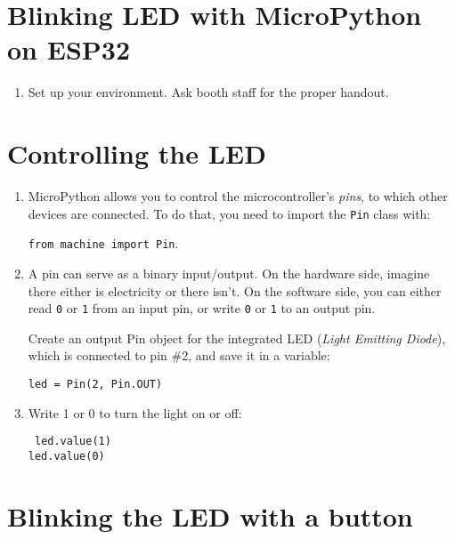 \documentclass[a4paper,10pt]{article}
\begin{document}
\section*{Blinking LED with MicroPython on ESP32}

\begin{enumerate}
\item Set up your environment. Ask booth staff for the proper handout.

\end{enumerate}

\section*{Controlling the LED}

\begin{enumerate}[resume]

\item MicroPython allows you to control the microcontroller's \emph{pins},
      to which other devices are connected.
      To do that, you need to import the \texttt{Pin} class with:

      \texttt{from machine import Pin}.

\item A pin can serve as a binary input/output.
      On the hardware side, imagine there either is electricity or there isn't.
      On the software side, you can either read \texttt{0} or \texttt{1} from an
      input pin, or write \texttt{0} or \texttt{1} to an output pin.

      Create an output Pin object for the integrated LED (\emph{Light Emitting Diode}),
      which is connected to pin \#2, and save it in a variable:

      \texttt{led = Pin(2, Pin.OUT)}

\item Write 1 or 0 to turn the light on or off:

    \texttt{
        led.value(1) \\
        led.value(0)
    }

\end{enumerate}

\section*{Blinking the LED with a button}
\end{document}
